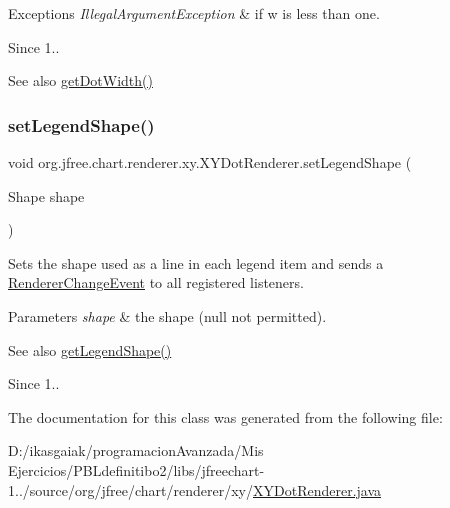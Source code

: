 \begin{DoxyExceptions}{Exceptions}
{\em Illegal\+Argument\+Exception} & if {\ttfamily w} is less than one.\\
\hline
\end{DoxyExceptions}
\begin{DoxySince}{Since}
1.. 
\end{DoxySince}
\begin{DoxySeeAlso}{See also}
\mbox{\hyperlink{classorg_1_1jfree_1_1chart_1_1renderer_1_1xy_1_1_x_y_dot_renderer_a957cd27a2e53b0caf7675f6abe030df5}{get\+Dot\+Width()}} 
\end{DoxySeeAlso}
\mbox{\label{classorg_1_1jfree_1_1chart_1_1renderer_1_1xy_1_1_x_y_dot_renderer_aef7933f6f0c55e2a3d79c989d2d5c950}} 
\subsubsection{\texorpdfstring{set\+Legend\+Shape()}{setLegendShape()}}
{\footnotesize\ttfamily void org.\+jfree.\+chart.\+renderer.\+xy.\+X\+Y\+Dot\+Renderer.\+set\+Legend\+Shape (\begin{DoxyParamCaption}\item[{Shape}]{shape }\end{DoxyParamCaption})}

Sets the shape used as a line in each legend item and sends a \mbox{\hyperlink{}{Renderer\+Change\+Event}} to all registered listeners.


\begin{DoxyParams}{Parameters}
{\em shape} & the shape ({\ttfamily null} not permitted).\\
\hline
\end{DoxyParams}
\begin{DoxySeeAlso}{See also}
\mbox{\hyperlink{classorg_1_1jfree_1_1chart_1_1renderer_1_1xy_1_1_x_y_dot_renderer_aa0a732764f5d566c2688798efe0b3733}{get\+Legend\+Shape()}}
\end{DoxySeeAlso}
\begin{DoxySince}{Since}
1.. 
\end{DoxySince}


The documentation for this class was generated from the following file\+:\begin{DoxyCompactItemize}
\item 
D\+:/ikasgaiak/programacion\+Avanzada/\+Mis Ejercicios/\+P\+B\+Ldefinitibo2/libs/jfreechart-\/1../source/org/jfree/chart/renderer/xy/\mbox{\hyperlink{_x_y_dot_renderer_8java}{X\+Y\+Dot\+Renderer.\+java}}\end{DoxyCompactItemize}

